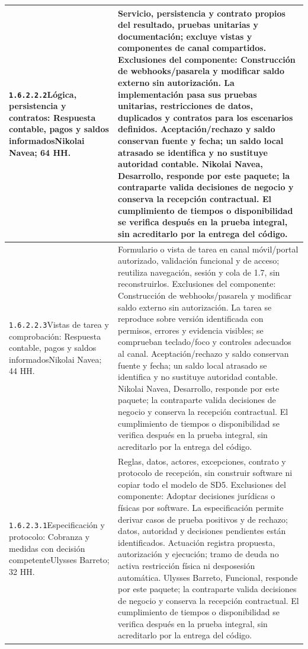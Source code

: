 \begin{longtable}{L{52mm}L{91mm}}
\texttt{1.\allowbreak{}6.\allowbreak{}2.\allowbreak{}2.\allowbreak{}2}\newline Lógica, persistencia y contratos: Respuesta contable, pagos y saldos informados\newline Nikolai Navea; 64 HH. & Servicio, persistencia y contrato propios del resultado, pruebas unitarias y documentación; excluye vistas y componentes de canal compartidos. Exclusiones del componente: Construcción de webhooks/pasarela y modificar saldo externo sin autorización. La implementación pasa sus pruebas unitarias, restricciones de datos, duplicados y contratos para los escenarios definidos. Aceptación/rechazo y saldo conservan fuente y fecha; un saldo local atrasado se identifica y no sustituye autoridad contable. Nikolai Navea, Desarrollo, responde por este paquete; la contraparte valida decisiones de negocio y conserva la recepción contractual. El cumplimiento de tiempos o disponibilidad se verifica después en la prueba integral, sin acreditarlo por la entrega del código.\\\hline
\texttt{1.\allowbreak{}6.\allowbreak{}2.\allowbreak{}2.\allowbreak{}3}\newline Vistas de tarea y comprobación: Respuesta contable, pagos y saldos informados\newline Nikolai Navea; 44 HH. & Formulario o vista de tarea en canal móvil/portal autorizado, validación funcional y de acceso; reutiliza navegación, sesión y cola de 1.7, sin reconstruirlos. Exclusiones del componente: Construcción de webhooks/pasarela y modificar saldo externo sin autorización. La tarea se reproduce sobre versión identificada con permisos, errores y evidencia visibles; se comprueban teclado/foco y controles adecuados al canal. Aceptación/rechazo y saldo conservan fuente y fecha; un saldo local atrasado se identifica y no sustituye autoridad contable. Nikolai Navea, Desarrollo, responde por este paquete; la contraparte valida decisiones de negocio y conserva la recepción contractual. El cumplimiento de tiempos o disponibilidad se verifica después en la prueba integral, sin acreditarlo por la entrega del código.\\\hline
\texttt{1.\allowbreak{}6.\allowbreak{}2.\allowbreak{}3.\allowbreak{}1}\newline Especificación y protocolo: Cobranza y medidas con decisión competente\newline Ulysses Barreto; 32 HH. & Reglas, datos, actores, excepciones, contrato y protocolo de recepción, sin construir software ni copiar todo el modelo de SD5. Exclusiones del componente: Adoptar decisiones jurídicas o físicas por software. La especificación permite derivar casos de prueba positivos y de rechazo; datos, autoridad y decisiones pendientes están identificados. Actuación registra propuesta, autorización y ejecución; tramo de deuda no activa restricción física ni desposesión automática. Ulysses Barreto, Funcional, responde por este paquete; la contraparte valida decisiones de negocio y conserva la recepción contractual. El cumplimiento de tiempos o disponibilidad se verifica después en la prueba integral, sin acreditarlo por la entrega del código.\\\hline

\end{longtable}

